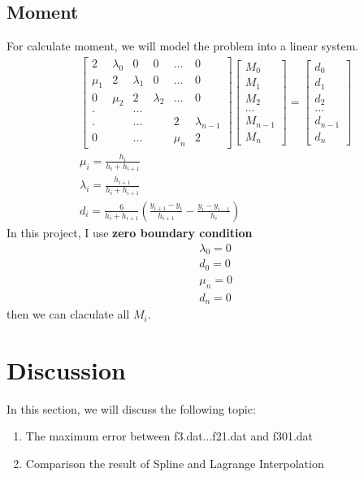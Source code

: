 \documentclass{article}
\begin{document}
\subsection{Moment}
For calculate moment, we will model the problem into a linear system.
\begin{align}
    &\begin{bmatrix}
        2 & \lambda_0 & 0 & 0 & ... & 0 \\
        \mu_1 & 2 & \lambda_1 & 0 & ... & 0  \\
        0 & \mu_2 & 2 & \lambda_2 & ... & 0 \\
        . &  & ... &\\
        . & & ... & & 2 & \lambda_{n-1}\\
        0 & & ... & & \mu_{n} & 2
    \end{bmatrix}
    \begin{bmatrix}
        M_0 \\
        M_1 \\
        M_2 \\
        ... \\
        M_{n-1} \\
        M_n
    \end{bmatrix}
    =
    \begin{bmatrix}
        d_0 \\
        d_1 \\
        d_2 \\
        ... \\
        d_{n-1} \\
        d_n
    \end{bmatrix} \\
    &\mu_i = \frac{h_i}{h_i + h_{i+1}} \\
    &\lambda_i = \frac{h_{i+1}}{h_i + h_{i+1}} \\
    &d_i = \frac{6}{h_i + h_{i+1}}(\frac{y_{i+1}-y_i}{h_{i+1}} - \frac{y_i-y_{i-1}}{h_i})
\end{align}
In this project, I use \textbf{zero boundary condition}
\begin{align*}
    &\lambda_0 = 0 \\
    &d_0 = 0 \\
    &\mu_n = 0 \\
    &d_n = 0
\end{align*}
then we can claculate all $M_i$.
\newpage

\section{Discussion}
In this section, we will discuss the following topic:
\begin{enumerate}
    \item The maximum error between f3.dat...f21.dat and f301.dat
    \item Comparison the result of Spline and Lagrange Interpolation
\end{enumerate}
\end{document}
